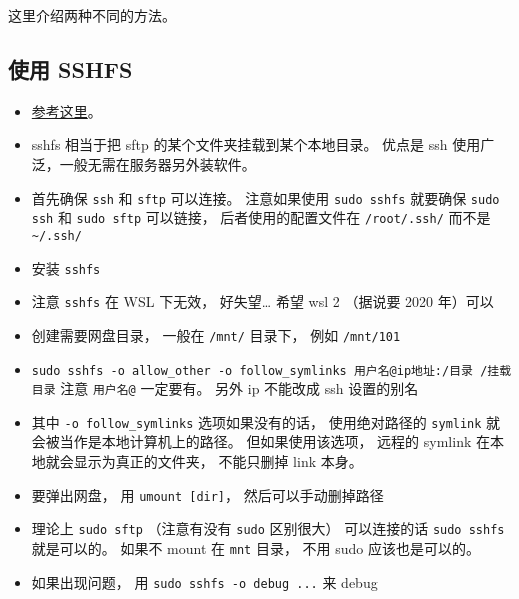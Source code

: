 
这里介绍两种不同的方法。

\subsection{使用 SSHFS}
\begin{itemize}
\item \href{https://www.digitalocean.com/community/tutorials/how-to-use-sshfs-to-mount-remote-file-systems-over-ssh}{参考这里}。
\item sshfs 相当于把 sftp 的某个文件夹挂载到某个本地目录。 优点是 ssh 使用广泛，一般无需在服务器另外装软件。
\item 首先确保 \verb`ssh` 和 \verb|sftp| 可以连接。 注意如果使用 \verb|sudo sshfs| 就要确保 \verb|sudo ssh| 和 \verb|sudo sftp| 可以链接， 后者使用的配置文件在 \verb|/root/.ssh/| 而不是 \verb|~/.ssh/|
\item 安装 \verb`sshfs`
\item 注意 \verb`sshfs` 在 WSL 下无效， 好失望… 希望 wsl 2 （据说要 2020 年）可以
\item 创建需要网盘目录， 一般在 \verb`/mnt/` 目录下， 例如 \verb`/mnt/101`
\item \verb`sudo sshfs -o allow_other -o follow_symlinks 用户名@ip地址:/目录 /挂载目录` 注意 \verb`用户名@` 一定要有。 另外 ip 不能改成 ssh 设置的别名
\item 其中 \verb|-o follow_symlinks| 选项如果没有的话， 使用绝对路径的 \verb|symlink| 就会被当作是本地计算机上的路径。 但如果使用该选项， 远程的 symlink 在本地就会显示为真正的文件夹， 不能只删掉 link 本身。
\item 要弹出网盘， 用 \verb`umount [dir]`， 然后可以手动删掉路径
\item 理论上 \verb|sudo sftp| （注意有没有 \verb|sudo| 区别很大） 可以连接的话 \verb|sudo sshfs| 就是可以的。 如果不 mount 在 \verb|mnt| 目录， 不用 sudo 应该也是可以的。
\item 如果出现问题， 用 \verb|sudo sshfs -o debug ...| 来 debug
\end{itemize}

